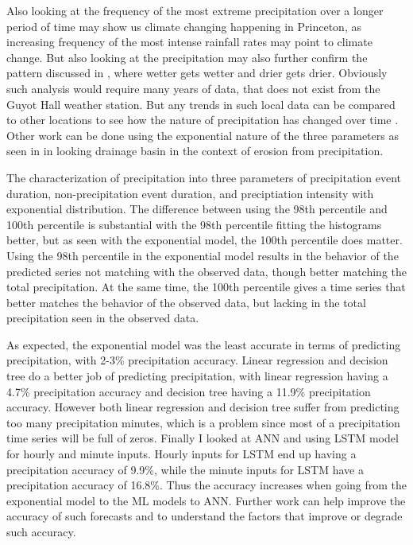 \documentclass[11pt]{report}
\begin{document}
Also looking at the frequency of the most extreme precipitation over a longer period of time may show us climate changing happening in Princeton, as increasing frequency of the most intense rainfall rates may point to climate change. But also looking at the precipitation may also further confirm the pattern discussed in \cite{Held}, where wetter gets wetter and drier gets drier. Obviously such analysis would require many years of data, that does not exist from the Guyot Hall weather station. But any trends in such local data can be compared to other locations to see how the nature of precipitation has changed over time \cite[]{AUST}. Other work can be done using the exponential nature of the three parameters as seen in \cite{Tucker} in looking drainage basin in the context of erosion from precipitation. 

The characterization of precipitation into three parameters of precipitation event duration, non-precipitation event duration, and preciptiation intensity with exponential distribution. The difference between using the 98th percentile and 100th percentile is substantial with the 98th percentile fitting the histograms better, but as seen with the exponential model, the 100th percentile does matter. Using the 98th percentile in the exponential model results in the behavior of the predicted series not matching with the observed data, though better matching the total precipitation.
At the same time, the 100th percentile gives a time series that better matches the behavior of the observed data, but lacking in the total precipitation seen in the observed data. 

As expected, the exponential model was the least accurate in terms of predicting precipitation, with 2-3\% precipitation accuracy. Linear regression and decision tree do a better job of predicting precipitation, with linear regression having a 4.7\% precipitation accuracy and decision tree having a 11.9\% precipitation accuracy. However both linear regression and decision tree suffer from predicting too many precipitation minutes, which is a problem since most of a precipitation time series will be full of zeros. Finally I looked at ANN and using LSTM model for hourly and minute inputs. Hourly inputs for LSTM end up having a precipitation accuracy of 9.9\%, while the minute inputs for LSTM have a precipitation accuracy of 16.8\%. Thus the accuracy increases when going from the exponential model to the ML models to ANN. Further work can help improve the accuracy of such forecasts and to understand the factors that improve or degrade such accuracy. 
\small
\renewcommand{\bibsep}{0em}
\end{document}
